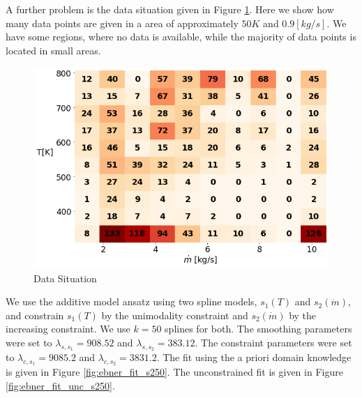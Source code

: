 \documentclass[10pt,a4paper]{article}
\begin{document}
A further problem is the data situation given in Figure \ref{fig:ebner_data_situation}. Here we show how many data points are given in a area of approximately $50 K$ and $0.9 [kg/s]$. We have some regions, where no data is available, while the majority of data points is located in small areas.


\begin{figure}[H]
	\centering
	\includegraphics[width=\columnwidth]{../thesisplots/ebner/data_distribution.png}
	\caption{Data Situation}
	\label{fig:ebner_data_situation}
\end{figure}

We use the additive model ansatz using two spline models, $s_1(T)$ and $s_2(\dot m)$, and constrain $s_1(T)$ by the unimodality constraint and $s_2(\dot m)$ by the increasing constraint. We use $k=50$ splines for both. The smoothing parameters were set to $\lambda_{s, s_1} = 908.52$ and $\lambda_{s, s_2} = 383.12$. The constraint parameters were set to $\lambda_{c, s_1} = 9085.2$ and $\lambda_{c, s_2} = 3831.2$. The fit using the a priori domain knowledge is given in Figure \ref{fig:ebner_fit_s250}. The unconstrained fit is given in Figure \ref{fig:ebner_fit_unc_s250}. 
\end{document}
